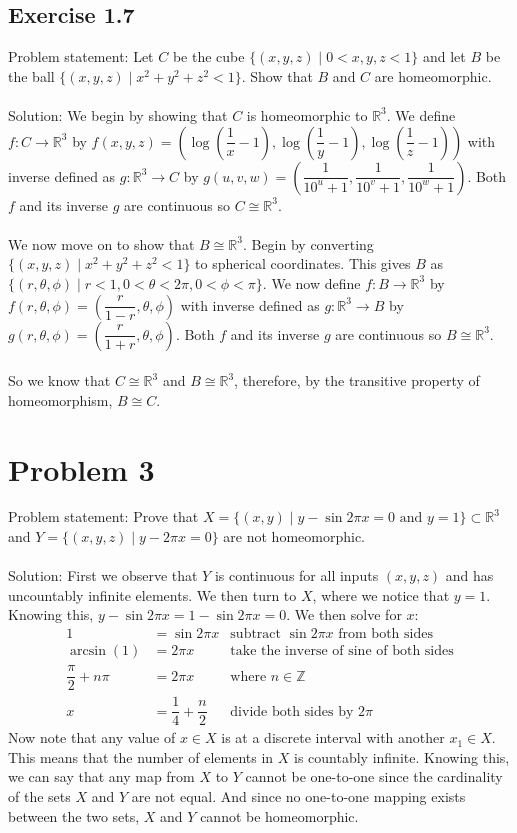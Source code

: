\documentclass{article}
\begin{document}
\subsection*{Exercise 1.7}
Problem statement: Let $C$ be the cube $\{ (x,y,z) \mid 0 < x,y,z < 1 \}$ and let $B$ be the ball $\{ (x,y,z) \mid x^2 + y^2 + z^2 < 1 \}$. Show that $B$ and $C$ are homeomorphic. \\\\
Solution: We begin by showing that $C$ is homeomorphic to $\mathbb{R}^3$. We define $f: C \to \mathbb{R}^3$ by $f(x,y,z) = (\log({\dfrac{1}{x}-1}), \log({\dfrac{1}{y}-1}), \log({\dfrac{1}{z}-1}))$ with inverse defined as $g: \mathbb{R}^3 \to C$ by $g(u,v,w)=(\dfrac{1}{10^u + 1}, \dfrac{1}{10^v + 1}, \dfrac{1}{10^w + 1})$. Both $f$ and its inverse $g$ are continuous so $C \cong \mathbb{R}^3$. \\\\
We now move on to show that $B \cong \mathbb{R}^3$. Begin by converting $\{ (x,y,z) \mid x^2 + y^2 + z^2 < 1 \}$ to spherical coordinates. This gives $B$ as $\{ (r, \theta, \phi) \mid r < 1, 0 < \theta < 2\pi, 0 < \phi < \pi \}$. We now define $f: B \to \mathbb{R}^3$ by $f(r, \theta, \phi)= (\dfrac{r}{1-r}, \theta, \phi)$ with inverse defined as $g: \mathbb{R}^3 \to B$ by $g(r, \theta, \phi)= (\dfrac{r}{1+r}, \theta, \phi)$. Both $f$ and its inverse $g$ are continuous so $B \cong \mathbb{R}^3$. \\\\
So we know that $C \cong \mathbb{R}^3$ and $B \cong \mathbb{R}^3$, therefore, by the transitive property of homeomorphism, $B \cong C$.

\newpage

\section*{Problem 3}
Problem statement: Prove that $X= \{ (x,y) \mid y - \sin{2 \pi x} = 0 \text{ and } y = 1 \} \subset \mathbb{R}^3$ and $Y= \{ (x,y,z) \mid y - 2 \pi x = 0 \}$ are not homeomorphic. \\\\
Solution: First we observe that $Y$ is continuous for all inputs $(x,y,z)$ and has uncountably infinite elements. We then turn to $X$, where we notice that $y=1$. Knowing this, $y-\sin{2 \pi x}= 1 - \sin{2 \pi x} = 0$. We then solve for $x$:
\begin{align*}
	1 &= \sin{2 \pi x} & \text{subtract } \sin{2 \pi x} \text{ from both sides} \\
	\arcsin(1) &= 2 \pi x & \text{take the inverse of sine of both sides} \\
	\dfrac{\pi}{2} + n\pi &= 2 \pi x & \text{where $n \in \mathbb{Z}$} \\
	x &= \dfrac{1}{4} + \dfrac{n}{2} & \text{divide both sides by $2\pi$}
\end{align*}
Now note that any value of $x \in X$ is at a discrete interval with another $x_1 \in X$. This means that the number of elements in $X$ is countably infinite. Knowing this, we can say that any map from $X$ to $Y$ cannot be one-to-one since the cardinality of the sets $X$ and $Y$ are not equal. And since no one-to-one mapping exists between the two sets, $X$ and $Y$ cannot be homeomorphic. 
\end{document}
